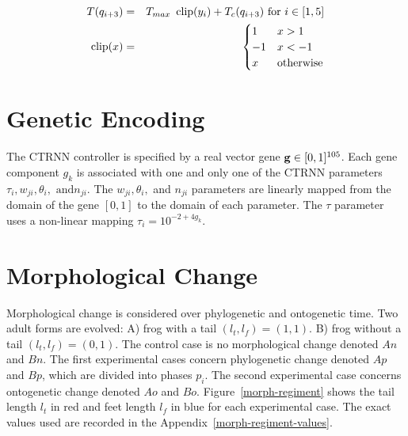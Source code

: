\begin{eqnarray}
  T(q_{i + 3}) &=& T_{max}~\operatorname{clip}(y_i) + T_c(q_{i + 3}) \text{ for } i \in [1,5] \label{limb-torque} \\
  \operatorname{clip}(x) &=& \begin{cases}
              1 & x > 1 \\
              -1 & x < -1 \\
              x & \text{otherwise} 
              \end{cases} 
\end{eqnarray}

\section{Genetic Encoding}

The CTRNN controller is specified by a real vector gene $\mathbf{g} \in [0,
  1]^{105}$.  Each gene component $g_k$ is associated with one and
only one of the CTRNN parameters $\tau_i, w_{ji}, \theta_i, \text{ and
} n_{ji}$.  The $w_{ji}, \theta_i,$ and $ n_{ji}$ parameters are
linearly mapped from the domain of the gene $[0,1]$ to the domain of
each parameter.  The $\tau$ parameter uses a non-linear mapping
$\tau_i = 10^{-2 + 4 g_k}$.

\section{Morphological Change}\label{morph-change}

Morphological change is considered over phylogenetic and ontogenetic
time.  Two adult forms are evolved: A) frog with a tail $({l_t},
{l_f}) = (1,1).$ B) frog without a tail $({l_t}, {l_f}) =
(0,1).$ The control case is no morphological change denoted $An$ and
$Bn$.  The first experimental cases concern phylogenetic change
denoted $Ap$ and $Bp$, which are divided into phases $p_i$.  The
second experimental case concerns ontogenetic change denoted $Ao$ and
$Bo$.  Figure~\ref{morph-regiment} shows the tail length ${l_t}$ in
red and feet length ${l_f}$ in blue for each experimental case.
The exact values used are recorded in the
Appendix~\ref{morph-regiment-values}.

